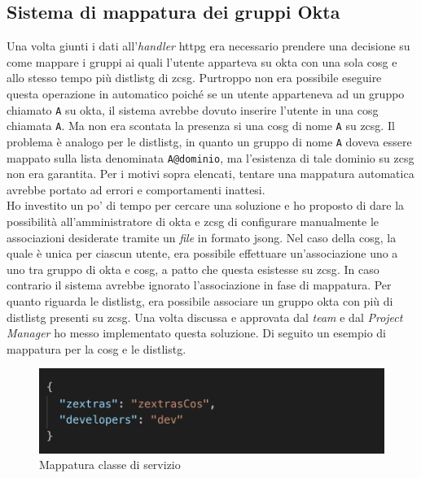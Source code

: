\subsection{Sistema di mappatura dei gruppi Okta}
Una volta giunti i dati all'\textit{handler} \gls{httpg} era necessario prendere una decisione su come mappare i gruppi ai quali l'utente apparteva su \gls{okta} con una sola \gls{cosg} e allo stesso tempo più \gls{distlistg} di \gls{zcsg}. Purtroppo non era possibile eseguire questa operazione in automatico poiché se un utente apparteneva ad un gruppo chiamato \texttt{A} su \gls{okta}, il sistema avrebbe dovuto inserire l'utente in una \gls{cosg} chiamata \texttt{A}. Ma non era scontata la presenza si una \gls{cosg} di nome \texttt{A} su \gls{zcsg}. Il problema è analogo per le \gls{distlistg}, in quanto un gruppo di nome \texttt{A} doveva essere mappato sulla lista denominata \texttt{A@dominio}, ma l'esistenza di tale dominio su \gls{zcsg} non era garantita. Per i motivi sopra elencati, tentare una mappatura automatica avrebbe portato ad errori e comportamenti inattesi. \\
Ho investito un po' di tempo per cercare una soluzione e ho proposto di dare la possibilità all'amministratore di \gls{okta} e \gls{zcsg} di configurare manualmente le associazioni desiderate tramite un \textit{file} in formato \gls{jsong}. Nel caso della \gls{cosg}, la quale è unica per ciascun utente, era possibile effettuare un'associazione uno a uno tra gruppo di \gls{okta} e \gls{cosg}, a patto che questa esistesse su \gls{zcsg}. In caso contrario il sistema avrebbe ignorato l'associazione in fase di mappatura. Per quanto riguarda le \gls{distlistg}, era possibile associare un gruppo \gls{okta} con più di \gls{distlistg} presenti su \gls{zcsg}.
Una volta discussa e approvata dal \textit{team} e dal \textit{Project Manager} ho messo implementato questa soluzione. Di seguito un esempio di mappatura per la \gls{cosg} e le \gls{distlistg}.

    \begin{figure}[ht]
        \centering
        \includegraphics[width=1\textwidth]{immagini/cosMapping.png}
        \caption{Mappatura classe di servizio}
        \label{fig: Mappatura classe di servizio}
    \end{figure}
    
